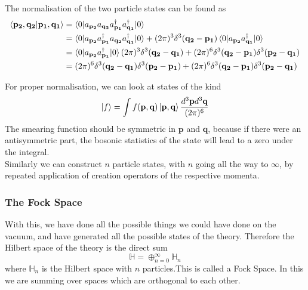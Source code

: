 \documentclass[11pt]{article}
\renewcommand{\a}[1]{a_\mathbf{#1}}
\newcommand{\adag}[1]{a^\dagger_\mathbf{#1}}
\numberwithin{equation}{section}
\begin{document}
    The normalisation of the two particle states can be found as 
    \begin{align*}
        \braket{\mathbf{p_2}, \mathbf{q_2} | \mathbf{p_1}, \mathbf{q_1}} &= \braket{0|\a{p_2}\a{q_2} \adag{p_1}\adag{q_1}|0}\\
        &= \braket{0|\a{p_2} \adag{p_1} \a{q_2} \adag{q_1}|0} + (2\pi)^3\delta^3(\mathbf{q_2} - \mathbf{p_1})\braket{0|\a{p_2}\adag{q_1}|0} \\
        &= \braket{0|\a{p_2} \adag{p_1}|0} (2\pi)^3\delta^3(\mathbf{q_2} - \mathbf{q_1})+ (2\pi)^6\delta^3(\mathbf{q_2} - \mathbf{p_1})\delta^3(\mathbf{p_2} - \mathbf{q_1}) \\
        &= (2\pi)^6\delta^3(\mathbf{q_2} - \mathbf{q_1})\delta^3(\mathbf{p_2} - \mathbf{p_1})+ (2\pi)^6\delta^3(\mathbf{q_2} - \mathbf{p_1})\delta^3(\mathbf{p_2} - \mathbf{q_1}) 
    \end{align*}

    For proper normalisation, we can look at states of the kind 
    \begin{equation*}
        \ket{f} = \int f(\textbf{p}, \textbf{q}) \ket{\textbf{p}, \textbf{q}} \frac{d^3\textbf{p}d^3\textbf{q}}{(2\pi)^6} 
    \end{equation*}
    The smearing function should be symmetric in \(\textbf{p}\) and \(\textbf{q}\), because if there were an antisymmetric part, the bosonic statistics of the state will lead to a zero under the integral.\\
    
    Similarly we can construct \(n\) particle states, with \(n\) going all the way to \(\infty\), by repeated application of creation operators of the respective momenta.\\

    \subsubsection{The Fock Space}    
    With this, we have done all the possible things we could have done on the vacuum, and have generated all the possible states of the theory. Therefore the Hilbert space of the theory is the direct sum 
    \begin{equation}
        \mathbb{H} = \oplus_{n=0}^{\infty}\mathbb{H}_n
    \end{equation}
    where \(\mathbb{H}_n\) is the Hilbert space with \(n\) particles.This is called a Fock Space. In this we are summing over spaces which are orthogonal to each other. \\
    
\end{document}
